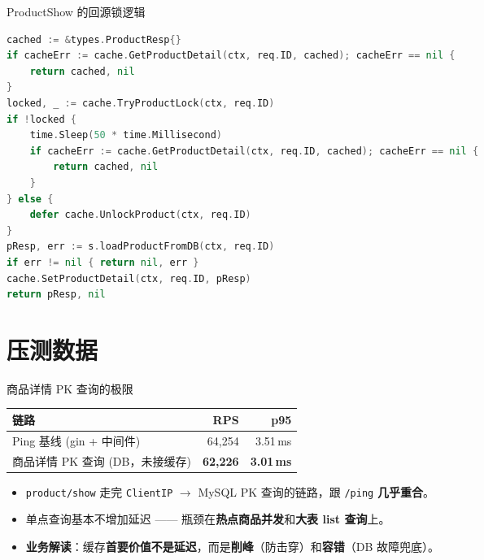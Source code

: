 \begin{frame}[fragile]{ProductShow 的回源锁逻辑}
\begin{lstlisting}[language=Go,firstnumber=42,
  caption={\srcnote{service/product.go:42--68}}]
cached := &types.ProductResp{}
if cacheErr := cache.GetProductDetail(ctx, req.ID, cached); cacheErr == nil {
    return cached, nil
}
locked, _ := cache.TryProductLock(ctx, req.ID)
if !locked {
    time.Sleep(50 * time.Millisecond)
    if cacheErr := cache.GetProductDetail(ctx, req.ID, cached); cacheErr == nil {
        return cached, nil
    }
} else {
    defer cache.UnlockProduct(ctx, req.ID)
}
pResp, err := s.loadProductFromDB(ctx, req.ID)
if err != nil { return nil, err }
cache.SetProductDetail(ctx, req.ID, pResp)
return pResp, nil
\end{lstlisting}
\end{frame}

\section{压测数据}

\begin{frame}{商品详情 PK 查询的极限}
\begin{tabular}{@{}lrr@{}}
\toprule
链路 & RPS & p95 \\
\midrule
Ping 基线 (gin + 中间件) & 64{,}254 & 3.51\,ms \\
商品详情 PK 查询 (DB，未接缓存) & \textbf{62{,}226} & \textbf{3.01\,ms} \\
\bottomrule
\end{tabular}

\vspace{3mm}
\begin{itemize}
  \item \texttt{product/show} 走完 \texttt{ClientIP} $\to$ MySQL PK 查询的链路，跟 \texttt{/ping} \textbf{几乎重合}。
  \item 单点查询基本不增加延迟 —— 瓶颈在\textbf{热点商品并发}和\textbf{大表 list 查询}上。
  \item \textbf{业务解读}：缓存\textbf{首要价值不是延迟}，而是\textbf{削峰}（防击穿）和\textbf{容错}（DB 故障兜底）。
\end{itemize}
\end{frame}

\appendix

